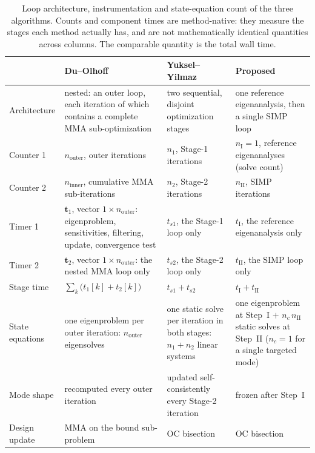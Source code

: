 \begin{table}[htbp]
\centering
\caption{Loop architecture, instrumentation and state-equation count of the
three algorithms.  Counts and component times are method-native: they
measure the stages each method actually has, and are not mathematically
identical quantities across columns.  The comparable quantity is the total
wall time.}
\label{tab:algo-accounting}
\renewcommand{\arraystretch}{1.35}
\begin{tabularx}{\textwidth}{@{}p{3.1cm}XXX@{}}
\toprule
 & \textbf{Du--Olhoff}
 & \textbf{Yuksel--Yilmaz}
 & \textbf{Proposed} \\
\midrule
Architecture
  & nested: an outer loop, each iteration of which contains a complete MMA
    sub-optimization
  & two sequential, disjoint optimization stages
  & one reference eigenanalysis, then a single SIMP loop \\
Counter 1
  & $n_{\mathrm{outer}}$, outer iterations
  & $n_1$, Stage-1 iterations
  & $n_{\mathrm{I}} = 1$, reference eigenanalyses (solve count) \\
Counter 2
  & $n_{\mathrm{inner}}$, cumulative MMA sub-iterations
  & $n_2$, Stage-2 iterations
  & $n_{\mathrm{II}}$, SIMP iterations \\
Timer 1
  & $\mathbf{t}_1$, vector $1\times n_{\mathrm{outer}}$: eigenproblem,
    sensitivities, filtering, update, convergence test
  & $t_{s1}$, the Stage-1 loop only
  & $t_{\mathrm{I}}$, the reference eigenanalysis only \\
Timer 2
  & $\mathbf{t}_2$, vector $1\times n_{\mathrm{outer}}$: the nested MMA loop
    only
  & $t_{s2}$, the Stage-2 loop only
  & $t_{\mathrm{II}}$, the SIMP loop only \\
Stage time
  & $\sum_k \bigl(t_1[k] + t_2[k]\bigr)$
  & $t_{s1} + t_{s2}$
  & $t_{\mathrm{I}} + t_{\mathrm{II}}$ \\
State equations
  & one eigenproblem per outer iteration: $n_{\mathrm{outer}}$ eigensolves
  & one static solve per iteration in both stages: $n_1 + n_2$ linear
    systems
  & one eigenproblem at Step~I $+$ $n_c\,n_{\mathrm{II}}$ static solves
    at Step~II ($n_c = 1$ for a single targeted mode) \\
Mode shape
  & recomputed every outer iteration
  & updated self-consistently every Stage-2 iteration
  & frozen after Step~I \\
Design update
  & MMA on the bound sub-problem
  & OC bisection
  & OC bisection \\
\bottomrule
\end{tabularx}
\end{table}

